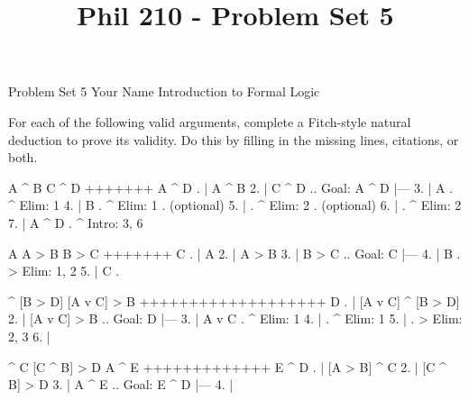
\title{Phil 210 - Problem Set 5}

\heading
Problem Set 5
Your Name
Introduction to Formal Logic
\endheading

For each of the following valid arguments, complete a Fitch-style natural deduction to prove its validity. Do this by filling in the missing lines, citations, or both.

\problems
{}
\argument
 A ^ B
 C ^ D
+++++++
 A ^ D
\endargument
        \answer
        . | A ^ B
         2. | C ^ D  ..  Goal: A ^ D
            |---
         3. | A      .  ^ Elim: 1
         4. | B      .  ^ Elim: 1  .  (optional)
         5. |        .  ^ Elim: 2  .  (optional)
         6. |        .  ^ Elim: 2
         7. | A ^ D  .  ^ Intro: 3, 6
        \endfitchproof
        \endanswer

\argument
 A
 A > B
 B > C
+++++++
 C
\endargument
        \answer
        . | A
         2. | A > B
         3. | B > C  ..  Goal: C
            |---
         4. | B      .  > Elim: 1, 2
         5. | C      .  
        \endfitchproof
        \endanswer

\argument
 [A v C] ^ [B > D]
 [A v C] > B
+++++++++++++++++++
 D
\endargument
        \answer
        . | [A v C] ^ [B > D]
         2. | [A v C] > B        ..  Goal: D
            |---
         3. | A v C              .  ^ Elim: 1
         4. |                    .  ^ Elim: 1
         5. |                    .  > Elim: 2, 3
         6. | 
        \endfitchproof
        \endanswer

\argument
 [A > B] ^ C
 [C ^ B] > D
 A ^ E
+++++++++++++
 E ^ D
\endargument
        \answer
        . | [A > B] ^ C
         2. | [C ^ B] > D
         3. | A ^ E        ..  Goal: E ^ D
            |---
         4. | 
        \endfitchproof
        \endanswer

\endproblems
\bye
